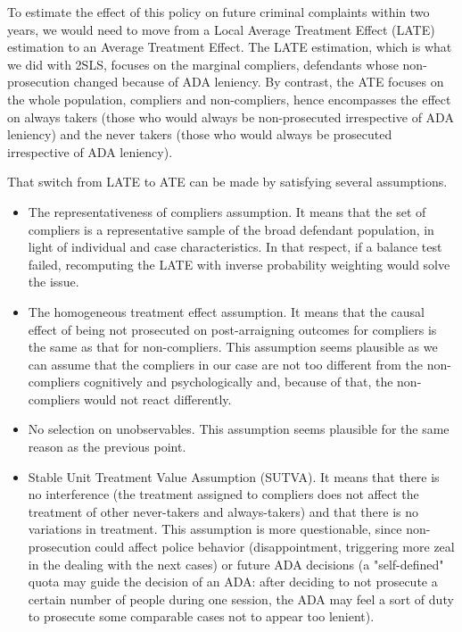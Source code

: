 \documentclass{article}
\begin{document}
To estimate the effect of this policy on future criminal complaints within two years, we would need to move from a Local Average Treatment Effect (LATE) estimation to an Average Treatment Effect. The LATE estimation, which is what we did with 2SLS, focuses on the marginal compliers, defendants whose non-prosecution changed because of ADA leniency. By contrast, the ATE focuses on the whole population, compliers and non-compliers, hence encompasses the effect on always takers (those who would always be non-prosecuted irrespective of ADA leniency) and the never takers (those who would always be prosecuted irrespective of ADA leniency).

That switch from LATE to ATE can be made by satisfying several assumptions.

\begin{itemize}
    \item The representativeness of compliers assumption. It means that the set of compliers is a representative sample of the broad defendant population, in light of individual and case characteristics. In that respect, if a balance test failed, recomputing the LATE with inverse probability weighting would solve the issue.
    \item The homogeneous treatment effect assumption. It means that the causal effect of being not prosecuted on post-arraigning outcomes for compliers is the same as that for non-compliers. This assumption seems plausible as we can assume that the compliers in our case are not too different from the non-compliers cognitively and psychologically and, because of that, the non-compliers would not react differently.
    \item No selection on unobservables. This assumption seems plausible for the same reason as the previous point.
    \item Stable Unit Treatment Value Assumption (SUTVA). It means that there is no interference (the treatment assigned to compliers does not affect the treatment of other never-takers and always-takers) and that there is no variations in treatment. This assumption is more questionable, since non-prosecution could affect police behavior (disappointment, triggering more zeal in the dealing with the next cases) or future ADA decisions (a "self-defined" quota may guide the decision of an ADA: after deciding to not prosecute a certain number of people during one session, the ADA may feel a sort of duty to prosecute some comparable cases not to appear too lenient).
\end{itemize}
\end{document}
